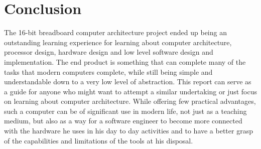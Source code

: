 \section{Conclusion}
The 16-bit breadboard computer architecture project ended up being an outstanding learning experience
for learning about computer architecture, processor design, hardware design and low level software
design and implementation. The end product is something that can complete many of the tasks that
modern computers complete, while still being simple and understandable down to a very low level of
abstraction. This report can serve as a guide for anyone who might want to attempt a similar
undertaking or just focus on learning about computer architecture. While offering few practical
advantages, such a computer can be of significant use in modern life, not just as a teaching medium,
but also as a way for a software engineer to become more connected with the hardware he uses in his
day to day activities and to have a better grasp of the capabilities and limitations of the tools
at his disposal.
